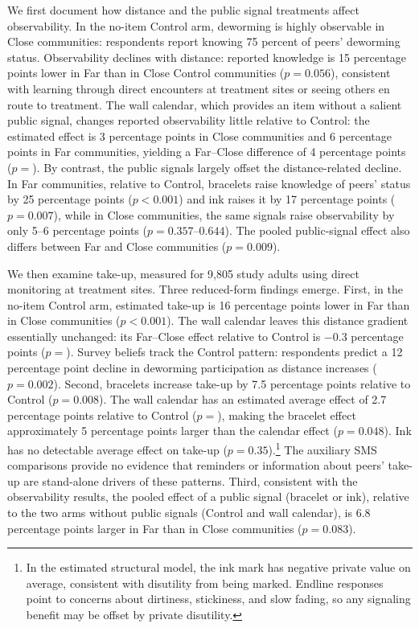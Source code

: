 \documentclass[12pt,a4paper]{article}
\begin{document}
We first document how distance and the public signal treatments affect observability. In the no-item Control arm, deworming is highly observable in Close communities: respondents report knowing 75 percent of peers' deworming status. Observability declines with distance: reported knowledge is 15 percentage points lower in Far than in Close Control communities (\(p=0.056\)), consistent with learning through direct encounters at treatment sites or seeing others en route to treatment. The wall calendar, which provides an item without a salient public signal, changes reported observability little relative to Control: the estimated effect is 3 percentage points in Close communities and 6 percentage points in Far communities, yielding a Far--Close difference of 4 percentage points (\(p=\)). By contrast, the public signals largely offset the distance-related decline. In Far communities, relative to Control, bracelets raise knowledge of peers' status by 25 percentage points (\(p<0.001\)) and ink raises it by 17 percentage points (\(p=0.007\)), while in Close communities, the same signals raise observability by only 5--6 percentage points (\(p=0.357\)--\(0.644\)). The pooled public-signal effect also differs between Far and Close communities (\(p=0.009\)).

We then examine take-up, measured for 9{,}805 study adults using direct monitoring at treatment sites. Three reduced-form findings emerge. First, in the no-item Control arm, estimated take-up is 16 percentage points lower in Far than in Close communities (\(p<0.001\)). The wall calendar leaves this distance gradient essentially unchanged: its Far--Close effect relative to Control is \(-0.3\) percentage points (\(p=\)). Survey beliefs track the Control pattern: respondents predict a 12 percentage point decline in deworming participation as distance increases (\(p=0.002\)). Second, bracelets increase take-up by 7.5 percentage points relative to Control (\(p=0.008\)). The wall calendar has an estimated average effect of 2.7 percentage points relative to Control (\(p=\)), making the bracelet effect approximately 5 percentage points larger than the calendar effect (\(p=0.048\)). Ink has no detectable average effect on take-up (\(p=0.35\)).\footnote{In the estimated structural model, the ink mark has negative private value on average, consistent with disutility from being marked. Endline responses point to concerns about dirtiness, stickiness, and slow fading, so any signaling benefit may be offset by private disutility.} The auxiliary SMS comparisons provide no evidence that reminders or information about peers' take-up are stand-alone drivers of these patterns. Third, consistent with the observability results, the pooled effect of a public signal (bracelet or ink), relative to the two arms without public signals (Control and wall calendar), is 6.8 percentage points larger in Far than in Close communities (\(p=0.083\)).
\end{document}
